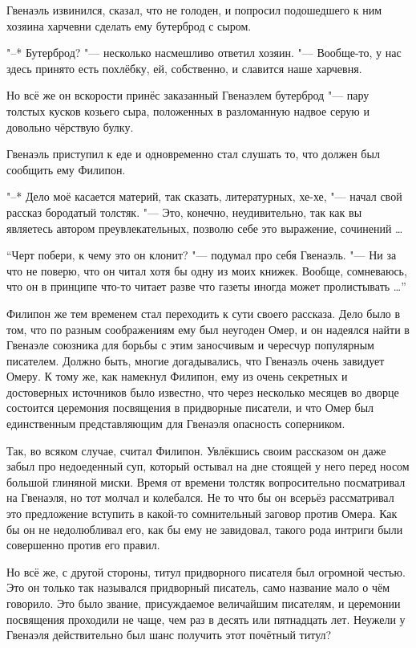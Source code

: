 Гвенаэль извинился, сказал, что не голоден, и попросил подошедшего к ним хозяина
харчевни сделать ему бутерброд с сыром.

"--* Бутерброд? "--- несколько насмешливо ответил хозяин.
"--- Вообще-то, у нас здесь принято есть похлёбку, ей, собственно, и славится
наше харчевня.

Но всё же он вскорости принёс заказанный Гвенаэлем бутерброд "--- пару толстых
кусков козьего сыра, положенных в разломанную надвое серую и довольно чёрствую
булку.

Гвенаэль приступил к еде и одновременно стал слушать то, что должен был сообщить
ему Филипон.

"--* Дело моё касается материй, так сказать, литературных, хе-хе, "--- начал
свой рассказ бородатый толстяк.
"--- Это, конечно, неудивительно, так как вы являетесь автором преувлекательных,
позволю себе это выражение, сочинений \ldots

\enquote{Черт побери, к чему это он клонит? "--- подумал про себя Гвенаэль.
"--- Ни за что не поверю, что он читал хотя бы одну из моих книжек.
Вообще, сомневаюсь, что он в принципе что-то читает разве что газеты иногда
может пролистывать \ldots}

Филипон же тем временем стал переходить к сути своего рассказа.
Дело было в том, что по разным соображениям ему был неугоден Омер, и он надеялся
найти в Гвенаэле союзника для борьбы с этим заносчивым и чересчур популярным
писателем.
Должно быть, многие догадывались, что Гвенаэль очень завидует Омеру.
К тому же, как намекнул Филипон, ему из очень секретных и достоверных источников
было известно, что через несколько месяцев во дворце состоится церемония
посвящения в придворные писатели, и что Омер был единственным представляющим для
Гвенаэля опасность соперником.

Так, во всяком случае, считал Филипон.
Увлёкшись своим рассказом он даже забыл про недоеденный суп, который остывал на
дне стоящей у него перед носом большой глиняной миски.
Время от времени толстяк вопросительно посматривал на Гвенаэля, но тот молчал и
колебался.
Не то что бы он всерьёз рассматривал это предложение вступить в какой-то
сомнительный заговор против Омера.
Как бы он не недолюбливал его, как бы ему не завидовал, такого рода интриги были
совершенно против его правил.

Но всё же, с другой стороны, титул придворного писателя был огромной честью.
Это он только так назывался придворный писатель, само название мало о чём
говорило.
Это было звание, присуждаемое величайшим писателям, и церемонии посвящения
проходили не чаще, чем раз в десять или пятнадцать лет.
Неужели у Гвенаэля действительно был шанс получить этот почётный титул?

